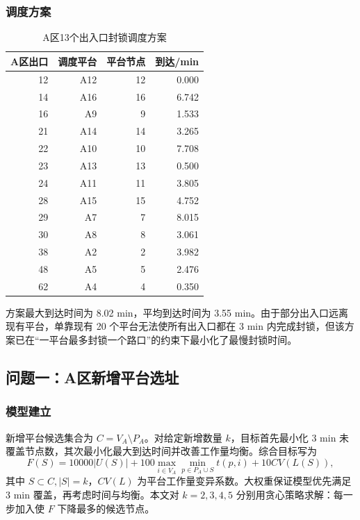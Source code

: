 \documentclass[UTF8,a4paper,12pt]{ctexart}
\begin{document}
\subsubsection{调度方案}
\begin{table}[H]\centering
\caption{A区13个出入口封锁调度方案}
\begin{tabular}{rrrr}
\toprule
A区出口 & 调度平台 & 平台节点 & 到达/min \\
\midrule
12 & A12 & 12 & 0.000 \\
14 & A16 & 16 & 6.742 \\
16 & A9 & 9 & 1.533 \\
21 & A14 & 14 & 3.265 \\
22 & A10 & 10 & 7.708 \\
23 & A13 & 13 & 0.500 \\
24 & A11 & 11 & 3.805 \\
28 & A15 & 15 & 4.752 \\
29 & A7 & 7 & 8.015 \\
30 & A8 & 8 & 3.061 \\
38 & A2 & 2 & 3.982 \\
48 & A5 & 5 & 2.476 \\
62 & A4 & 4 & 0.350 \\
\bottomrule
\end{tabular}
\end{table}
方案最大到达时间为 8.02 min，平均到达时间为 3.55 min。由于部分出入口远离现有平台，单靠现有 20 个平台无法使所有出入口都在 3 min 内完成封锁，但该方案已在“一平台最多封锁一个路口”的约束下最小化了最慢封锁时间。

\subsection{问题一：A区新增平台选址}
\subsubsection{模型建立}
新增平台候选集合为 $C=V_A\setminus P_A$。对给定新增数量 $k$，目标首先最小化 3 min 未覆盖节点数，其次最小化最大到达时间并改善工作量均衡。综合目标写为
\begin{equation}
F(S)=10000|U(S)|+100\max_{i\in V_A}\min_{p\in P_A\cup S}t(p,i)+10CV(L(S)),
\end{equation}
其中 $S\subset C, |S|=k$，$CV(L)$ 为平台工作量变异系数。大权重保证模型优先满足 3 min 覆盖，再考虑时间与均衡。本文对 $k=2,3,4,5$ 分别用贪心策略求解：每一步加入使 $F$ 下降最多的候选节点。
\end{document}
